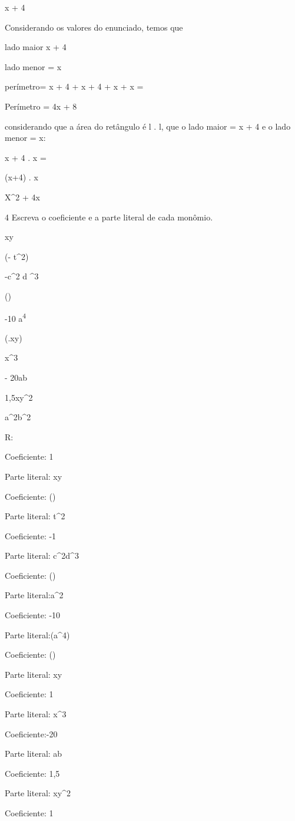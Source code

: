 {x + 4
\item Considerando os valores do enunciado, temos que

lado maior x + 4

lado menor = x

perímetro= x + 4 + x + 4 + x + x =

Perímetro = 4x + 8
\item considerando que a área do retângulo é l . l, que o lado maior = x +
4 e o lado menor = x:

x + 4 . x =

(x+4) . x

X^2 + 4x

\num{4} Escreva o coeficiente e a parte literal de cada monômio.
\item xy
\item (- t^2)
\item -c^2 d ^3
\item ()
\item-10 a\textsuperscript{4}
\item (.{xy})
\item x^3
\item - 20ab
\item 1,5xy^2
\item a^2b^2

R:
\item

Coeficiente: 1

Parte literal: xy
\item Coeficiente: ()

Parte literal: t^2
\item Coeficiente: -1

Parte literal: c^2d^3
\item Coeficiente: ()

Parte literal:a^2
\item Coeficiente: -10

Parte literal:(a^4)
\item Coeficiente: ()

Parte literal: xy
\item Coeficiente: 1

Parte literal: x^3
\item Coeficiente:-20

Parte literal: ab
\item Coeficiente: 1,5

Parte literal: xy^2
\item Coeficiente: 1

}
